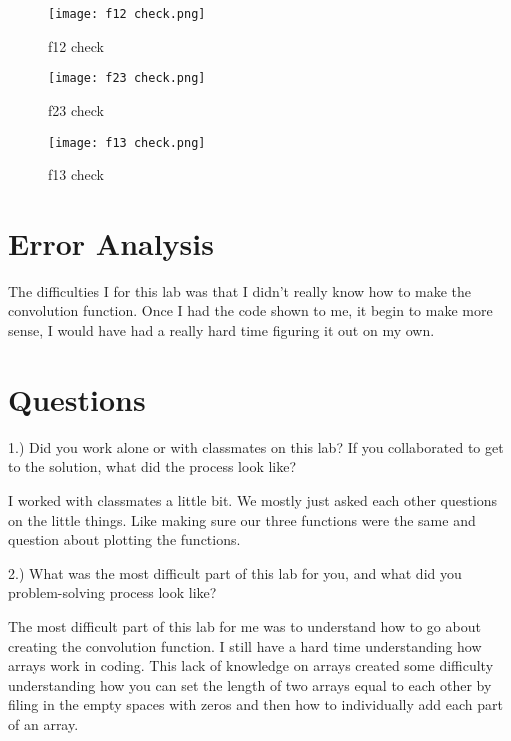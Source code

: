 \documentclass[11pt,a4]{report}
\begin{document}
\begin{figure}[h!]
    \begin{center}
  \caption{f12 check}
  \texttt{[image: f12 check.png]}
\end{center}
\end{figure}
\newpage
\begin{figure}[h!]
    \begin{center}
  \caption{f23 check}
  \texttt{[image: f23 check.png]}
\end{center}
\end{figure}

\begin{figure}[h!]
    \begin{center}
  \caption{f13 check}
  \texttt{[image: f13 check.png]}
\end{center}
\end{figure}



\section{Error Analysis}

The difficulties I for this lab was that I didn't really know how to make the convolution function. Once I had the code shown to me, it begin to make more sense, I would have had a really hard time figuring it out on my own. 

\section{Questions}
1.) Did you work alone or with classmates on this lab? If you collaborated to get to the solution, what did the process look like?

I worked with classmates a little bit. We mostly just asked each other questions on the little things. Like making sure our three functions were the same and question about plotting the functions. 

2.) What was the most difficult part of this lab for you, and what did you problem-solving process look like? 

The most difficult part of this lab for me was to understand how to go about creating the convolution function. I still have a hard time understanding how arrays work in coding. This lack of knowledge on arrays created some difficulty understanding how you can set the length of two arrays equal to each other by filing in the empty spaces with zeros and then how to individually add each part of an array. 
\end{document}
